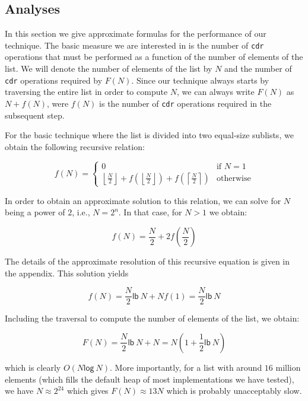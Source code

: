 \subsection{Analyses}
\label{sec-analyses}

In this section we give approximate formulas for the performance of
our technique.
The basic measure we are interested in is the number
of \texttt{cdr} operations that must be performed as a function of the
number of elements of the list.  We will denote the number of elements
of the list by $N$ and the number of \texttt{cdr} operations required
by $F(N)$.  Since our technique always starts by traversing the entire
list in order to compute $N$, we can always write $F(N)$ as $N +
f(N)$, were $f(N)$ is the number of \texttt{cdr} operations required
in the subsequent step.

For the basic technique where the list is divided into two equal-size
sublists, we obtain the following recursive relation:

\label{analyse1}
\[ f(N) = \left\{ \begin{array}{ll}
                    0 & \mbox{if $N = 1$} \\
                    \left\lfloor\frac{N}{2}\right\rfloor
                    + f(\left\lfloor\frac{N}{2}\right\rfloor)
                    + f(\left\lceil\frac{N}{2}\right\rceil) &
                    \mbox{otherwise}
                  \end{array} \right. \]

In order to obtain an approximate solution to this relation, we can
solve for $N$ being a power of $2$, i.e., $N = 2^n$.  In that case,
for $N>1$ we obtain:

\[ f(N) = \frac{N}{2} + 2f(\frac{N}{2}) \]

The details of the approximate resolution of this recursive equation
is given in the appendix.
This solution yields

\[ f(N) = \frac{N}{2}\mathsf{lb}~N + Nf(1) = \frac{N}{2}\mathsf{lb}~N\]

Including the traversal to compute the number of elements of the list,
we obtain:

\[ F(N) = \frac{N}{2}\mathsf{lb}~N + N = N(1 + \frac{1}{2}\mathsf{lb}~N)\]

which is clearly $O(N\mathsf{log}~N)$.  More importantly, for a list
with around $16$ million elements (which fills the default heap of most
implementations we have tested), we have $N \approx 2^{24}$ which
gives $F(N) \approx 13N$ which is probably unacceptably slow.

